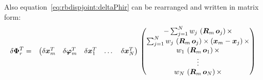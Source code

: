 Also equation~\ref{eq:rbdispjoint:deltaPhir} can be rearranged and written in matrix form:
\begin{eqnarray}
\delta\bm{\Phi}_r^T & = &
\begin{pmatrix}
\delta\bm{x}_m^T &
\delta\bm{\varphi}_m^T &
\delta\bm{x}_1^T &
\hdots{} &
\delta\bm{x}_N^T
\end{pmatrix} \,
\begin{pmatrix}
-\sum_{j=1}^N w_j\,\left(\bm{R}_m\,\bm{o}_j\right)\times \\
\sum_{j=1}^N w_j\,\left(\bm{R}_m\,\bm{o}_j\right)\times\left(\bm{x}_m - \bm{x}_j\right)\times \\
w_1\,\left(\bm{R}_m\,\bm{o}_1\right)\times \\
\vdots{} \\
w_N\,\left(\bm{R}_m\,\bm{o}_N\right)\times
\end{pmatrix}
\end{eqnarray}
